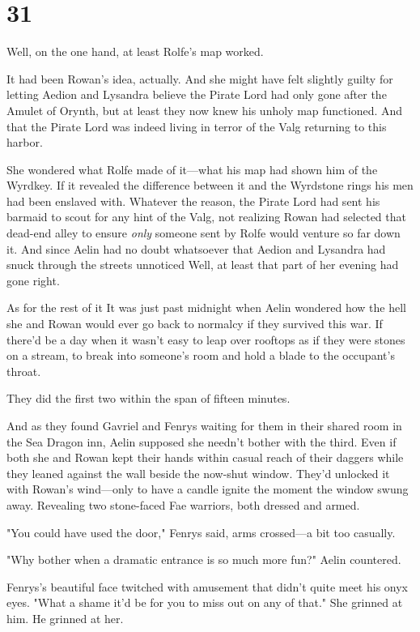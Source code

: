 
\chapter{31}

Well, on the one hand, at least Rolfe's map worked.

It had been Rowan's idea, actually. And she might have felt slightly guilty for letting Aedion and Lysandra believe the Pirate Lord had only gone after the Amulet of Orynth, but  at least they now knew his unholy map functioned. And that the Pirate Lord was indeed living in terror of the Valg returning to this harbor.

She wondered what Rolfe made of it---what his map had shown him of the Wyrdkey. If it revealed the difference between it and the Wyrdstone rings his men had been enslaved with. Whatever the reason, the Pirate Lord had sent his barmaid to scout for any hint of the Valg, not realizing Rowan had selected that dead-end alley to ensure \emph{only}
someone sent by Rolfe would venture so far down it. And since Aelin had no doubt whatsoever that Aedion and Lysandra had snuck through the streets unnoticed  Well, at least that part of her evening had gone right.

As for the rest of it  It was just past midnight when Aelin wondered how the hell she and Rowan would ever go back to normalcy if they survived this war. If there'd be a day when it wasn't easy to leap over rooftops as if they were stones on a stream, to break into someone's room and hold a blade to the occupant's throat.

They did the first two within the span of fifteen minutes.

And as they found Gavriel and Fenrys waiting for them in their shared room in the Sea Dragon inn, Aelin supposed she needn't bother with the third. Even if both she and Rowan kept their hands within casual reach of their daggers while they leaned against the wall beside the now-shut window. They'd unlocked it with Rowan's wind---only to have a candle ignite the moment the window swung away. Revealing two stone-faced Fae warriors, both dressed and armed.

"You could have used the door," Fenrys said, arms crossed---a bit too casually.

"Why bother when a dramatic entrance is so much more fun?" Aelin countered.

Fenrys's beautiful face twitched with amusement that didn't quite meet his onyx eyes. "What a shame it'd be for you to miss out on any of that." She grinned at him. He grinned at her.

